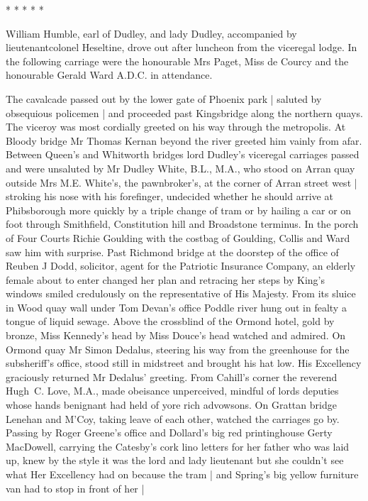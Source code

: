     * * * * *


William Humble,
earl of Dudley,
and lady Dudley,
accompanied by
lieutenantcolonel Heseltine,
drove out after luncheon
from the viceregal
lodge.
In the following carriage
were the honourable Mrs Paget,
Miss de
Courcy
and the honourable Gerald Ward A.D.C.
in attendance.

The cavalcade passed out by the lower gate of Phoenix park |
saluted by obsequious policemen |
and proceeded past Kingsbridge
along the northern quays.
The viceroy was most cordially greeted
on his way through the metropolis.
At Bloody bridge
Mr Thomas Kernan beyond the river
greeted him vainly from afar.
Between Queen's and Whitworth bridges
lord
Dudley's viceregal carriages passed
and were unsaluted by Mr Dudley White, B.L., M.A.,
who stood on Arran quay outside Mrs M.E. White's,
the pawnbroker's,
at the corner of Arran street west |
stroking his nose with his forefinger,
undecided whether he should arrive at Phibsborough
more quickly by a triple change of tram
or by hailing a car
or on foot
through Smithfield, Constitution hill and Broadstone terminus.
In the porch of Four Courts
Richie Goulding with the costbag of Goulding,
Collis and Ward
saw him with surprise.
Past Richmond bridge
at the
doorstep of the office of Reuben J Dodd, solicitor,
agent for the
Patriotic Insurance Company,
an elderly female about to enter
changed
her plan
and retracing her steps by King's windows
smiled credulously
on the representative of His Majesty.
From its sluice in Wood quay
wall
under Tom Devan's office
Poddle river hung out in fealty
a tongue
of liquid sewage.
Above the crossblind of the Ormond hotel,
gold by
bronze,
Miss Kennedy's head by Miss Douce's head
watched and admired.
On Ormond quay
Mr Simon Dedalus,
steering his way from the greenhouse for the subsheriff's office,
stood still in midstreet
and brought his hat low.
His Excellency graciously returned Mr Dedalus' greeting.
From Cahill's corner
the reverend Hugh~C. Love, M.A.,
made obeisance
unperceived,
mindful of lords deputies
whose hands benignant
had held of yore rich advowsons.
On Grattan bridge
Lenehan and M'Coy,
taking leave of each other,
watched the carriages go by.
Passing by Roger
Greene's office
and Dollard's big red printinghouse
Gerty MacDowell,
carrying the Catesby's cork lino letters
for her father who was laid up,
knew by the style
it was the lord and lady lieutenant
but she couldn't see
what Her Excellency had on
because the tram |
and Spring's big yellow furniture van
had to stop in front of her |
